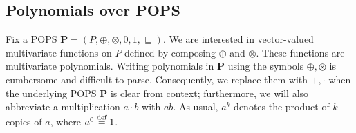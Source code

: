 


\subsection{Polynomials over POPS}
\label{subsec:polynomial}

Fix a POPS $\bm P = (P, \oplus, \otimes, 0, 1, \sqsubseteq)$.
We are interested in vector-valued multivariate functions on $P$
defined by composing $\oplus$ and $\otimes$.
These functions are multivariate polynomials.
Writing polynomials in $\bm P$ using the symbols $\oplus, \otimes$
is cumbersome and difficult to parse. Consequently, we replace them with $+, \cdot$ when the underlying
POPS $\bm P$ is clear from context; furthermore, we will also
abbreviate a multiplication $a\cdot b$ with $ab$.  As usual, $a^k$
denotes the product of $k$ copies of $a$, where $a^0 \stackrel{\text{def}}{=} 1$.

